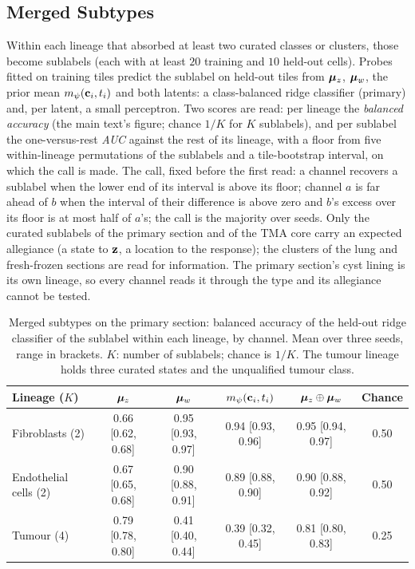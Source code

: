 \subsection{Merged Subtypes}
\label{app:subtype}

Within each lineage that absorbed at least two curated classes or clusters, those become sublabels (each with at least $20$ training and $10$ held-out cells). Probes fitted on training tiles predict the sublabel on held-out tiles from $\boldsymbol{\mu}_z$, $\boldsymbol{\mu}_w$, the prior mean $m_{\psi}(\mathbf{c}_i, t_i)$ and both latents: a class-balanced ridge classifier (primary) and, per latent, a small perceptron. Two scores are read: per lineage the \emph{balanced accuracy} (the main text's figure; chance $1/K$ for $K$ sublabels), and per sublabel the one-versus-rest \emph{AUC} against the rest of its lineage, with a floor from five within-lineage permutations of the sublabels and a tile-bootstrap interval, on which the call is made. The call, fixed before the first read: a channel recovers a sublabel when the lower end of its interval is above its floor; channel $a$ is far ahead of $b$ when the interval of their difference is above zero and $b$'s excess over its floor is at most half of $a$'s; the call is the majority over seeds. Only the curated sublabels of the primary section and of the TMA core carry an expected allegiance (a state to $\mathbf{z}$, a location to the response); the clusters of the lung and fresh-frozen sections are read for information. The primary section's cyst lining is its own lineage, so every channel reads it through the type and its allegiance cannot be tested.

\begin{table}[!htbp]
\centering
\caption{Merged subtypes on the primary section: balanced accuracy of the held-out ridge classifier of the sublabel within each lineage, by channel. Mean over three seeds, range in brackets. $K$: number of sublabels; chance is $1/K$. The tumour lineage holds three curated states and the unqualified tumour class.}
\label{tab:S-subtype-ba}
\small
\setlength{\tabcolsep}{4pt}
\begin{tabular}{@{}lccccc@{}}
\toprule
Lineage ($K$) & $\boldsymbol{\mu}_z$ & $\boldsymbol{\mu}_w$ & $m_{\psi}(\mathbf{c}_i, t_i)$ & $\boldsymbol{\mu}_z \oplus \boldsymbol{\mu}_w$ & Chance \\
\midrule
Fibroblasts (2) & 0.66 [0.62, 0.68] & 0.95 [0.93, 0.97] & 0.94 [0.93, 0.96] & 0.95 [0.94, 0.97] & 0.50 \\
Endothelial cells (2) & 0.67 [0.65, 0.68] & 0.90 [0.88, 0.91] & 0.89 [0.88, 0.90] & 0.90 [0.88, 0.92] & 0.50 \\
Tumour (4) & 0.79 [0.78, 0.80] & 0.41 [0.40, 0.44] & 0.39 [0.32, 0.45] & 0.81 [0.80, 0.83] & 0.25 \\
\bottomrule
\end{tabular}
\end{table}

